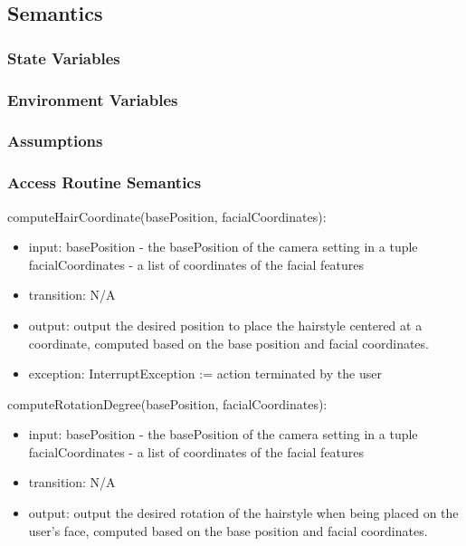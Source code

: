 \documentclass[12pt, titlepage]{article}
\begin{document}
\subsection{Semantics}

\subsubsection{State Variables}

\subsubsection{Environment Variables}

\subsubsection{Assumptions}

\subsubsection{Access Routine Semantics}
\noindent computeHairCoordinate(basePosition, facialCoordinates):
\begin{itemize}
\item input: basePosition - the basePosition of the camera setting in a tuple \\
facialCoordinates - a list of coordinates of the facial features
\item transition: N/A
\item output: output the desired position to place the hairstyle centered at a coordinate, computed based on the base position and facial coordinates.
\item exception: InterruptException := action terminated by the user
\end{itemize}

\noindent computeRotationDegree(basePosition, facialCoordinates):
\begin{itemize}
\item input: basePosition - the basePosition of the camera setting in a tuple \\
facialCoordinates - a list of coordinates of the facial features
\item transition: N/A
\item output: output the desired rotation of the hairstyle when being placed on the user's face, computed based on the base position and facial coordinates.
\end{itemize}
\end{document}
